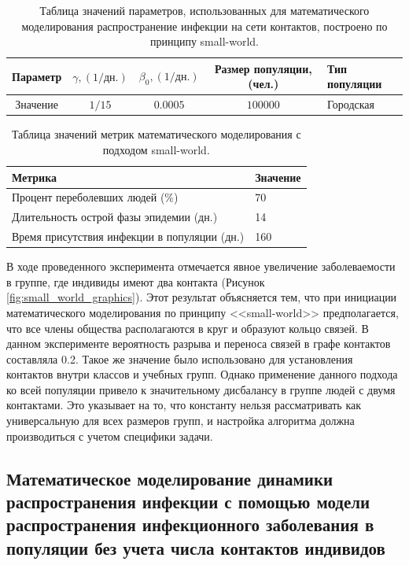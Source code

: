 \documentclass[14pt,a4paper]{article}
\begin{document}
\begin{table}[h!]
	\centering
	\caption{Таблица значений параметров, использованных для математического моделирования распространение инфекции на сети контактов, построено по принципу small-world.}
	\begin{tabularx}{\textwidth}{|c|c|c|c|X|}
		\hline
		Параметр &  $\gamma,  (1/\text{дн.})$ & $\beta_0,  (1/\text{дн.})$ & Размер популяции, (чел.) & Тип популяции \\
		\hline
		Значение & $1/15$ & $0.0005$ & $100000$ & Городская \\
		\hline
	\end{tabularx}
	\label{tab:table_paremeters_small_world}
\end{table}

\begin{table}[h!]
	\centering
	\caption{Таблица значений метрик математического моделирования с подходом small-world.}
	\begin{tabularx}{\textwidth}{|X|X|}
		\hline
		Метрика & Значение \\ 
		\hline
		Процент переболевших людей (\%)& 70 \\ 
		\hline
		Длительность острой фазы эпидемии (дн.) & 14 \\ 
		\hline
		Время присутствия инфекции в популяции (дн.) & 160 \\ 
		\hline
	\end{tabularx}
	\label{tab:results_small_world}
\end{table}

В ходе проведенного эксперимента отмечается явное увеличение заболеваемости в группе, где индивиды имеют два контакта (Рисунок  \ref{fig:small_world_graphics}). Этот результат объясняется тем, что при инициации математического моделирования по принципу <<small-world>> предполагается, что все члены общества располагаются в круг и образуют кольцо связей. В данном эксперименте вероятность разрыва и переноса связей в графе контактов составляла 0.2. Такое же значение было использовано для установления контактов внутри классов и учебных групп. Однако применение данного подхода ко всей популяции привело к значительному дисбалансу в группе людей с двумя контактами. Это указывает на то, что константу нельзя рассматривать как универсальную для всех размеров групп, и настройка алгоритма должна производиться с учетом специфики задачи.



\subsection{Математическое моделирование динамики распространения инфекции с помощью модели распространения инфекционного заболевания в популяции без учета числа контактов индивидов} 
\end{document}
